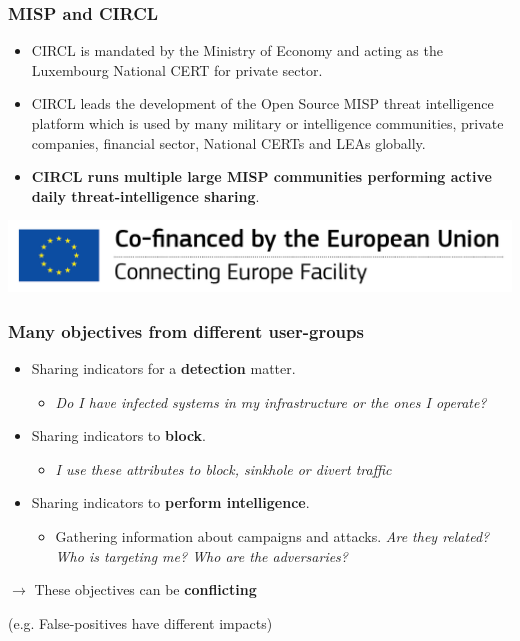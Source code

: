 \begin{frame}
\frametitle{MISP and CIRCL}
\begin{itemize}
\item CIRCL is mandated by the Ministry of Economy and acting as the Luxembourg National CERT for private sector.
\item CIRCL leads the development of the Open Source MISP threat intelligence platform which is used by many military or intelligence communities, private companies, financial sector, National CERTs and LEAs globally.
\item {\bf CIRCL runs multiple large MISP communities performing active daily threat-intelligence sharing}.
\end{itemize}
        \includegraphics{en_cef.png}
\end{frame}

\begin{frame}
\frametitle{Many objectives from different user-groups}
    \begin{itemize}
        \item Sharing indicators for a {\bf detection} matter.
            \begin{itemize}
                \item \textit{Do I have infected systems in my infrastructure or the ones I operate?}
            \end{itemize}
    \item Sharing indicators to {\bf block}.
            \begin{itemize}
                \item \textit{I use these attributes to block, sinkhole or divert traffic}
            \end{itemize}
    \item Sharing indicators to {\bf perform intelligence}.
            \begin{itemize}
                \item Gathering information about campaigns and attacks. \textit{Are they related? Who is targeting me? Who are the adversaries?}
            \end{itemize}
        \end{itemize}
        
        \vspace{1em}
        \begin{center}
        $\rightarrow$ These objectives can be {\bf conflicting}

        (e.g. False-positives have different impacts)
        \end{center}
    \end{frame}

